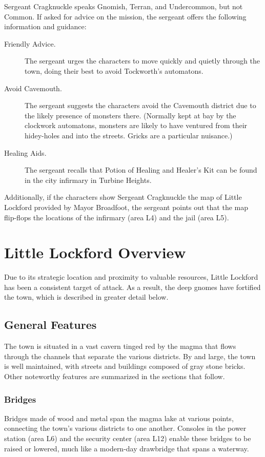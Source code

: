 \documentclass[10pt,a4paper,twoside,bg=print,twocolumn,openany,nodeprecatedcode]{dndbook}
\begin{document}
Sergeant Cragknuckle speaks Gnomish, Terran, and Undercommon, but not Common. If asked for advice on the mission, the sergeant offers the following information and guidance:


\begin{description}
\item[Friendly Advice.]
The sergeant urges the characters to move quickly and quietly through the town, doing their best to avoid Tockworth's automatons.
\item[Avoid Cavemouth.]
The sergeant suggests the characters avoid the Cavemouth district due to the likely presence of monsters there. (Normally kept at bay by the clockwork automatons, monsters are likely to have ventured from their hidey-holes and into the streets. Gricks are a particular nuisance.)
\item[Healing Aids.]
The sergeant recalls that Potion of Healing and Healer's Kit can be found in the city infirmary in Turbine Heights.
\end{description}

Additionally, if the characters show Sergeant Cragknuckle the map of Little Lockford provided by Mayor Broadfoot, the sergeant points out that the map flip-flops the locations of the infirmary (area L4) and the jail (area L5).

\section{Little Lockford Overview}
Due to its strategic location and proximity to valuable resources, Little Lockford has been a consistent target of attack. As a result, the deep gnomes have fortified the town, which is described in greater detail below.

\subsection{General Features}
The town is situated in a vast cavern tinged red by the magma that flows through the channels that separate the various districts. By and large, the town is well maintained, with streets and buildings composed of gray stone bricks. Other noteworthy features are summarized in the sections that follow.

\subsubsection{Bridges}
Bridges made of wood and metal span the magma lake at various points, connecting the town's various districts to one another. Consoles in the power station (area L6) and the security center (area L12) enable these bridges to be raised or lowered, much like a modern-day drawbridge that spans a waterway.
\end{document}
